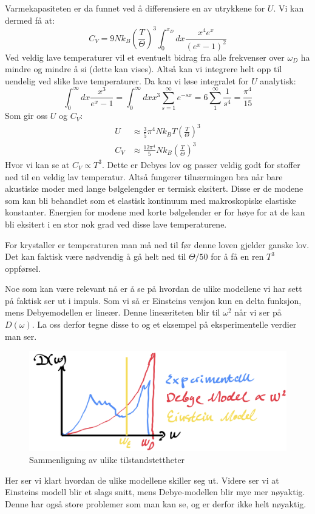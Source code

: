 \documentclass{article}
\begin{document}
Varmekapasiteten er da funnet ved å differensiere en av utrykkene for $U$. Vi kan dermed få at:
\begin{equation}
    C_V = 9 N k_B \left(\frac{T}{\Theta}\right)^3 \int_0^{x_D} dx \frac{x^4 e^x}{\left(e^x-1\right)^2}
\end{equation}
Ved veldig lave temperaturer vil et eventuelt bidrag fra alle frekvenser over $\omega_D$ ha mindre og mindre å si (dette kan vises). Altså kan vi integrere helt opp til uendelig ved slike lave temperaturer. Da kan vi løse integralet for $U$ analytisk:
\begin{equation}
    \int^\infty_0 dx \frac{x^3}{e^x-1} = \int^\infty_0 dx x^3 \sum^\infty_{s=1} e^{-sx} = 6 \sum_1^\infty \frac{1}{s^4} = \frac{\pi^4}{15}
\end{equation}
Som gir oss $U$ og $C_V$:
\begin{align}
    U &\approx \frac{3}{5} \pi^4 N k_B T \left(\frac{T}{\Theta}\right)^3 \\
    C_V &\approx \frac{12 \pi^4}{5} N k_B \left(\frac{T}{\Theta}\right)^3 
\end{align}
Hvor vi kan se at $C_V \propto T^3$. Dette er Debyes lov og passer veldig godt for stoffer ned til en veldig lav temperatur. Altså fungerer tilnærmingen bra når bare akustiske moder med lange bølgelengder er termisk eksitert. Disse er de modene som kan bli behandlet som et elastisk kontinuum med makroskopiske elastiske konstanter. Energien for modene med korte bølgelender er for høye for at de kan  bli eksitert i en stor nok grad ved disse lave temperaturene.

For krystaller er temperaturen man må ned til før denne loven gjelder ganske lov. Det kan faktisk være nødvendig å gå helt ned til $\Theta/50$ for å få en ren $T^3$ oppførsel.

Noe som kan være relevant nå er å se på hvordan de ulike modellene vi har sett på faktisk ser ut i impuls. Som vi så er Einsteins versjon kun en delta funksjon, mens Debyemodellen er lineær. Denne lineæriteten blir til $\omega^2$ når vi ser på $D(\omega)$. La oss derfor tegne disse to og et eksempel på eksperimentelle verdier man ser.
\begin{figure}[H]
    \centering
    \includegraphics[width=0.5\linewidth]{bilder/tilstandstetthetssammenligning.png}
    \caption{Sammenligning av ulike tilstandstettheter}
    \label{fig:tilstandstetthetssammenligning}
\end{figure}
Her ser vi klart hvordan de ulike modellene skiller seg ut. Videre ser vi at Einsteins modell blir et slags snitt, mens Debye-modellen blir mye mer nøyaktig. Denne har også store problemer som man kan se, og er derfor ikke helt nøyaktig.
\end{document}
